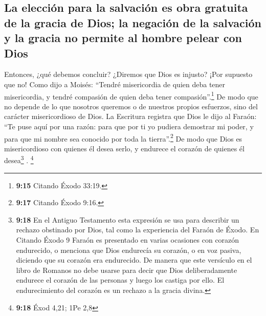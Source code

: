 \hypertarget{la-elecciuxf3n-para-la-salvaciuxf3n-es-obra-gratuita-de-la-gracia-de-dios-la-negaciuxf3n-de-la-salvaciuxf3n-y-la-gracia-no-permite-al-hombre-pelear-con-dios}{%
\subsection{La elección para la salvación es obra gratuita de la gracia
de Dios; la negación de la salvación y la gracia no permite al hombre
pelear con
Dios}\label{la-elecciuxf3n-para-la-salvaciuxf3n-es-obra-gratuita-de-la-gracia-de-dios-la-negaciuxf3n-de-la-salvaciuxf3n-y-la-gracia-no-permite-al-hombre-pelear-con-dios}}

 Entonces, ¿qué debemos concluir? ¿Diremos que Dios es
injusto? ¡Por supuesto que no!  Como dijo a Moisés:
``Tendré misericordia de quien deba tener misericordia, y tendré
compasión de quien deba tener compasión''.\footnote{\textbf{9:15}
  Citando Éxodo 33:19.}  De modo que no depende de lo que
nosotros queremos o de nuestros propios esfuerzos, sino del carácter
misericordioso de Dios.  La Escritura registra que Dios
le dijo al Faraón: ``Te puse aquí por una razón: para que por ti yo
pudiera demostrar mi poder, y para que mi nombre sea conocido por toda
la tierra''.\footnote{\textbf{9:17} Citando Éxodo 9:16.} 
De modo que Dios es misericordioso con quienes él desea serlo, y
endurece el corazón de quienes él desea\footnote{\textbf{9:18} En el
  Antiguo Testamento esta expresión se usa para describir un rechazo
  obstinado por Dios, tal como la experiencia del Faraón de Éxodo. En
  Citando Éxodo 9 Faraón es presentado en varias ocasiones con corazón
  endurecido, o menciona que Dios endurecía su corazón, o en voz pasiva,
  diciendo que su corazón era endurecido. De manera que este versículo
  en el libro de Romanos no debe usarse para decir que Dios
  deliberadamente endurece el corazón de las personas y luego los
  castiga por ello. El endurecimiento del corazón es un rechazo a la
  gracia divina.} . \footnote{\textbf{9:18} Éxod 4,21; 1Pe 2,8}

